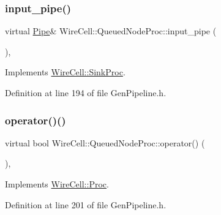 \subsubsection{\texorpdfstring{input\+\_\+pipe()}{input\_pipe()}}
{\footnotesize\ttfamily virtual \hyperlink{namespace_wire_cell_afce9bb01c731347c3d4c8ca9d4ed804f}{Pipe}\& Wire\+Cell\+::\+Queued\+Node\+Proc\+::input\+\_\+pipe (\begin{DoxyParamCaption}{ }\end{DoxyParamCaption})\hspace{0.3cm}{\ttfamily [inline]}, {\ttfamily [virtual]}}



Implements \hyperlink{class_wire_cell_1_1_sink_proc_a47ec8c790457ad63e9d0bb9b1b7da935}{Wire\+Cell\+::\+Sink\+Proc}.



Definition at line 194 of file Gen\+Pipeline.\+h.

\mbox{\label{class_wire_cell_1_1_queued_node_proc_a7ce2fbfadbf84f8031ef7315e7a6ee70}} 
\subsubsection{\texorpdfstring{operator()()}{operator()()}}
{\footnotesize\ttfamily virtual bool Wire\+Cell\+::\+Queued\+Node\+Proc\+::operator() (\begin{DoxyParamCaption}{ }\end{DoxyParamCaption})\hspace{0.3cm}{\ttfamily [inline]}, {\ttfamily [virtual]}}



Implements \hyperlink{class_wire_cell_1_1_proc_a9c642ed1f6b6741633c6cb1bd063b502}{Wire\+Cell\+::\+Proc}.



Definition at line 201 of file Gen\+Pipeline.\+h.

\mbox{\label{class_wire_cell_1_1_queued_node_proc_acf62ea51c7b689e364721888479473b6}} 
